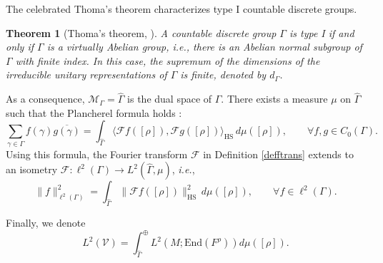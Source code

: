 \documentclass[11pt,oneside,reqno]{amsart}
\newtheorem{theorem}{Theorem}[section]
\theoremstyle{definition}
\newtheorem{definition}{Definition}[section]
\numberwithin{equation}{section}
\theoremstyle{plain}
\begin{document}

The celebrated Thoma's theorem characterizes type I countable discrete groups.

\begin{theorem}[Thoma's theorem, \cite{thoma1964unitare, tonti2019thoma}]\label{typeIandvirtuelly}
A countable discrete group $\Gamma$ is type I if and only if $\Gamma$ is a virtually Abelian group, \emph{i.e.}, there is an Abelian normal subgroup of $\Gamma$ with finite index. In this case, the supremum of the dimensions of the irreducible unitary representations of $\Gamma$ is finite, denoted by $d_\Gamma$.
\end{theorem}


As a consequence, $\mathcal{M}_{\Gamma } = \widehat{\Gamma}$ is the dual space of $\Gamma$. There exists a measure $\mu$ on $\widehat{\Gamma}$ such that the Plancherel formula holds \cite{folland2016course}: 
\begin{equation*}
    \sum_{\gamma \in \Gamma} f(\gamma) \overline{g(\gamma)}= \int_{\widehat{\Gamma}} \big\langle  \mathcal{F}f([\rho]) , \mathcal{F}g([\rho]) \big\rangle_{\mathrm{HS}}  \,d\mu([\rho]), \qquad \forall f,g\in C_0(\Gamma).
\end{equation*}
Using this formula, the Fourier transform $\mathcal{F}$ in Definition \ref{defftrans} extends to an isometry $\mathcal{F} :\ell^2(\Gamma) \rightarrow L^2(\widehat{\Gamma},\mu)$, \emph{i.e.},  
\begin{equation}\label{uniF}
    \| f\|_{\ell^2(\Gamma)}^2 = \int_{\widehat{\Gamma}} \|\mathcal{F}f([\rho]) \|_{\mathrm{HS}}^2 \,d\mu([\rho]) , \qquad \forall f\in \ell^2(\Gamma).
\end{equation}

Finally, we denote 
\begin{equation*}
    L^2(\mathcal{V}) = \int_{\widehat{\Gamma}}^{\oplus}L^2(M;\mathrm{End}(F^{\rho}))d\mu([\rho]).
\end{equation*}
\end{document}
